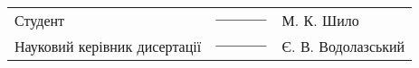 \begin{table}[H]
    \centering
    \begin{tabular}{p{3.7in} p{1.2in} p{1.8in}}

        Студент                      & ${\text{\underline{\hspace{4em}}}}$  & М. К. Шило         \\
        Науковий керівник дисертації & ${\text{\underline{\hspace{4em}}}} $ & Є. В. Водолазський
    \end{tabular}
\end{table}

\clearpage

